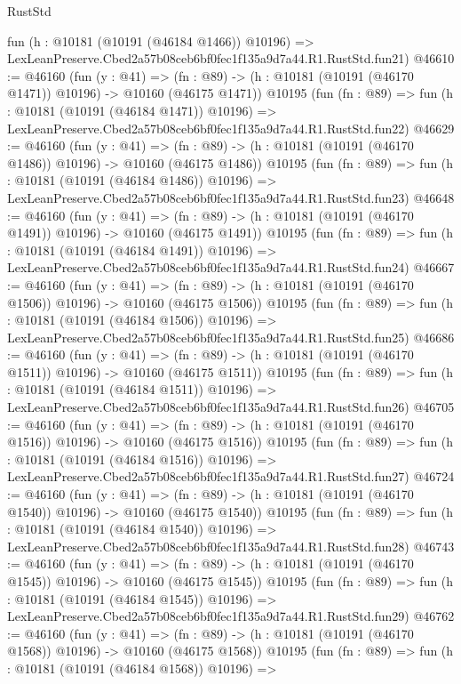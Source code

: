 \begin{lexlean}{RustStd}
\begin{coremodule}
    fun (h : @10181 (@10191 (@46184 @1466)) @10196) =>
    LexLeanPreserve.Cbed2a57b08ceb6bf0fec1f135a9d7a44.R1.RustStd.fun21)
@46610 := @46160
    (fun (y : @41) =>
    (fn : @89) -> (h : @10181 (@10191 (@46170 @1471)) @10196) -> @10160 (@46175 @1471))
    @10195
    (fun (fn : @89) =>
    fun (h : @10181 (@10191 (@46184 @1471)) @10196) =>
    LexLeanPreserve.Cbed2a57b08ceb6bf0fec1f135a9d7a44.R1.RustStd.fun22)
@46629 := @46160
    (fun (y : @41) =>
    (fn : @89) -> (h : @10181 (@10191 (@46170 @1486)) @10196) -> @10160 (@46175 @1486))
    @10195
    (fun (fn : @89) =>
    fun (h : @10181 (@10191 (@46184 @1486)) @10196) =>
    LexLeanPreserve.Cbed2a57b08ceb6bf0fec1f135a9d7a44.R1.RustStd.fun23)
@46648 := @46160
    (fun (y : @41) =>
    (fn : @89) -> (h : @10181 (@10191 (@46170 @1491)) @10196) -> @10160 (@46175 @1491))
    @10195
    (fun (fn : @89) =>
    fun (h : @10181 (@10191 (@46184 @1491)) @10196) =>
    LexLeanPreserve.Cbed2a57b08ceb6bf0fec1f135a9d7a44.R1.RustStd.fun24)
@46667 := @46160
    (fun (y : @41) =>
    (fn : @89) -> (h : @10181 (@10191 (@46170 @1506)) @10196) -> @10160 (@46175 @1506))
    @10195
    (fun (fn : @89) =>
    fun (h : @10181 (@10191 (@46184 @1506)) @10196) =>
    LexLeanPreserve.Cbed2a57b08ceb6bf0fec1f135a9d7a44.R1.RustStd.fun25)
@46686 := @46160
    (fun (y : @41) =>
    (fn : @89) -> (h : @10181 (@10191 (@46170 @1511)) @10196) -> @10160 (@46175 @1511))
    @10195
    (fun (fn : @89) =>
    fun (h : @10181 (@10191 (@46184 @1511)) @10196) =>
    LexLeanPreserve.Cbed2a57b08ceb6bf0fec1f135a9d7a44.R1.RustStd.fun26)
@46705 := @46160
    (fun (y : @41) =>
    (fn : @89) -> (h : @10181 (@10191 (@46170 @1516)) @10196) -> @10160 (@46175 @1516))
    @10195
    (fun (fn : @89) =>
    fun (h : @10181 (@10191 (@46184 @1516)) @10196) =>
    LexLeanPreserve.Cbed2a57b08ceb6bf0fec1f135a9d7a44.R1.RustStd.fun27)
@46724 := @46160
    (fun (y : @41) =>
    (fn : @89) -> (h : @10181 (@10191 (@46170 @1540)) @10196) -> @10160 (@46175 @1540))
    @10195
    (fun (fn : @89) =>
    fun (h : @10181 (@10191 (@46184 @1540)) @10196) =>
    LexLeanPreserve.Cbed2a57b08ceb6bf0fec1f135a9d7a44.R1.RustStd.fun28)
@46743 := @46160
    (fun (y : @41) =>
    (fn : @89) -> (h : @10181 (@10191 (@46170 @1545)) @10196) -> @10160 (@46175 @1545))
    @10195
    (fun (fn : @89) =>
    fun (h : @10181 (@10191 (@46184 @1545)) @10196) =>
    LexLeanPreserve.Cbed2a57b08ceb6bf0fec1f135a9d7a44.R1.RustStd.fun29)
@46762 := @46160
    (fun (y : @41) =>
    (fn : @89) -> (h : @10181 (@10191 (@46170 @1568)) @10196) -> @10160 (@46175 @1568))
    @10195
    (fun (fn : @89) =>
    fun (h : @10181 (@10191 (@46184 @1568)) @10196) =>

\end{coremodule}
\end{lexlean}
